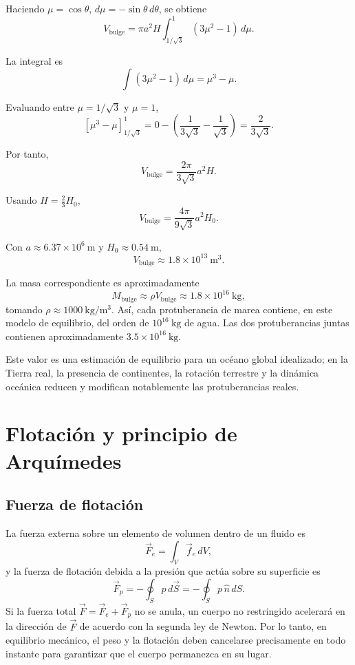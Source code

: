 Haciendo $\mu = \cos\theta$, $d\mu = -\sin\theta\,d\theta$, se obtiene
$$ V_{\mathrm{bulge}} = \pi a^2 H \int_{1/\sqrt{3}}^1 (3\mu^2 - 1)\,d\mu. $$

La integral es
$$ \int (3\mu^2 - 1)\,d\mu = \mu^3 - \mu. $$

Evaluando entre $\mu = 1/\sqrt{3}$ y $\mu = 1$,
$$ \left[\mu^3 - \mu\right]_{1/\sqrt{3}}^1 = 0 - \left(\frac{1}{3\sqrt{3}} - \frac{1}{\sqrt{3}}\right) = \frac{2}{3\sqrt{3}}. $$

Por tanto,
$$ V_{\mathrm{bulge}} = \frac{2\pi}{3\sqrt{3}}a^2H. $$

Usando $H = \frac{2}{3}H_0$,
$$ V_{\mathrm{bulge}} = \frac{4\pi}{9\sqrt{3}}a^2H_0. $$

Con $a \approx 6.37\times 10^6\ \mathrm{m}$ y $H_0 \approx 0.54\ \mathrm{m}$,
$$ V_{\mathrm{bulge}} \approx 1.8\times 10^{13}\ \mathrm{m^3}. $$

La masa correspondiente es aproximadamente
$$ M_{\mathrm{bulge}} \approx \rho V_{\mathrm{bulge}} \approx 1.8\times 10^{16}\ \mathrm{kg}, $$
tomando $\rho \approx 1000\ \mathrm{kg/m^3}$. Así, cada protuberancia de marea contiene, en este modelo de equilibrio, del orden de $10^{16}\ \mathrm{kg}$ de agua. Las dos protuberancias juntas contienen aproximadamente $3.5\times 10^{16}\ \mathrm{kg}$.

Este valor es una estimación de equilibrio para un océano global idealizado; en la Tierra real, la presencia de continentes, la rotación terrestre y la dinámica oceánica reducen y modifican notablemente las protuberancias reales.

\section{Flotación y principio de Arquímedes}

\subsection{Fuerza de flotación}

La fuerza externa sobre un elemento de volumen dentro de un fluido es
$$ \vec{F}_e = \int_V \vec{f}_e\,dV, $$
y la fuerza de flotación debida a la presión que actúa sobre su superficie es
$$ \vec{F}_p = -\oint_S p\,d\vec{S} = -\oint_S p\,\hat{n}\,dS. $$
Si la fuerza total $\vec{F} = \vec{F}_e + \vec{F}_p$ no se anula, un cuerpo no restringido acelerará en la dirección de $\vec{F}$ de acuerdo con la segunda ley de Newton. Por lo tanto, en equilibrio mecánico, el peso y la flotación deben cancelarse precisamente en todo instante para garantizar que el cuerpo permanezca en su lugar.

